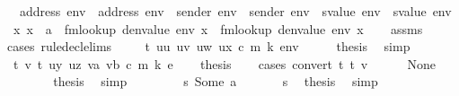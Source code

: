 \begin{isabellebody}
\ \ \ {\isachardoublequoteopen}address\ env\ {\isacharequal}{\kern0pt}\ address\ env{\isacharprime}{\kern0pt}\ {\isasymand}\ sender\ env\ {\isacharequal}{\kern0pt}\ sender\ env{\isacharprime}{\kern0pt}\ {\isasymand}\ svalue\ env\ {\isacharequal}{\kern0pt}\ svalue\ env{\isacharprime}{\kern0pt}\ {\isasymand}\ {\isacharparenleft}{\kern0pt}{\isasymforall}x{\isachardot}{\kern0pt}\ x\ {\isasymnoteq}\ a{}\ {\isasymlongrightarrow}\ fmlookup\ {\isacharparenleft}{\kern0pt}denvalue\ env{\isacharprime}{\kern0pt}{\isacharparenright}{\kern0pt}\ x\ {\isacharequal}{\kern0pt}\ fmlookup\ {\isacharparenleft}{\kern0pt}denvalue\ env{\isacharparenright}{\kern0pt}\ x{\isacharparenright}{\kern0pt}{\isachardoublequoteclose}\isanewline
%
\isadelimproof
\ \ %
\endisadelimproof
%
\isatagproof
{}\isamarkupfalse%
\ assms\isanewline
{}\isamarkupfalse%
\ {\isacharparenleft}{\kern0pt}cases\ rule{\isacharcolon}{\kern0pt}decl{\isachardot}{\kern0pt}elims{\isacharparenright}{\kern0pt}\isanewline
\ \ \isamarkupfalse%
\ {\isacharparenleft}{\kern0pt}{}\ t\ uu\ uv\ uw\ ux\ c\ m\ k\ env{\isacharparenright}{\kern0pt}\isanewline
\ \ \isamarkupfalse%
\ \isamarkupfalse%
\ {\isacharquery}{\kern0pt}thesis\ \isamarkupfalse%
\ simp\isanewline
{}\isamarkupfalse%
\isanewline
\ \ \isamarkupfalse%
\ {\isacharparenleft}{\kern0pt}{}\ t\ v\ t{\isacharprime}{\kern0pt}\ uy\ uz\ va\ vb\ c\ m\ k\ e{\isacharparenright}{\kern0pt}\isanewline
\ \ \isamarkupfalse%
\ {\isacharquery}{\kern0pt}thesis\isanewline
\ \ \isamarkupfalse%
\ {\isacharparenleft}{\kern0pt}cases\ {\isachardoublequoteopen}convert\ t{\isacharprime}{\kern0pt}\ t\ v{\isachardoublequoteclose}{\isacharparenright}{\kern0pt}\isanewline
\ \ \ \ \isamarkupfalse%
\ None\isanewline
\ \ \ \ \isamarkupfalse%
\ {}\ \isamarkupfalse%
\ {\isacharquery}{\kern0pt}thesis\ \isamarkupfalse%
\ simp\isanewline
\ \ \isamarkupfalse%
\isanewline
\ \ \ \ \isamarkupfalse%
\ s{\isacharcolon}{\kern0pt}\ {\isacharparenleft}{\kern0pt}Some\ a{\isacharparenright}{\kern0pt}\isanewline
\ \ \ \ \isamarkupfalse%
\ {}\ s\ \isamarkupfalse%
\ {\isacharquery}{\kern0pt}thesis\ \isamarkupfalse%
\ simp\isanewline
\ \ \isamarkupfalse%
\isanewline
{}\isamarkupfalse%
\isanewline
\ \ \isamarkupfalse%

\end{isabellebody}
